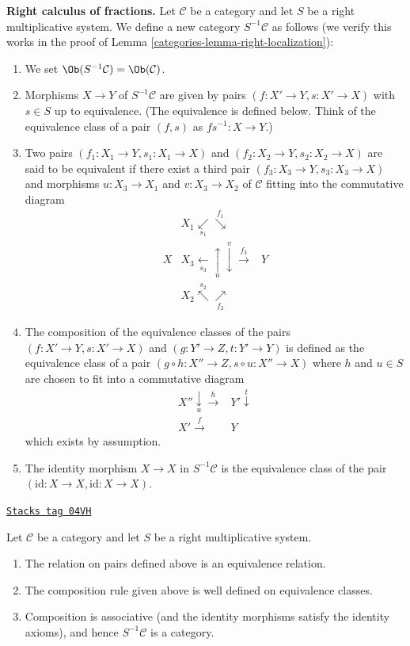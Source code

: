 {\bf Right calculus of fractions.}
Let $\mathcal{C}$ be a category and let $S$ be a right multiplicative
system. We define a new category $S^{-1}\mathcal{C}$ as follows
(we verify this works in the proof of
Lemma \ref{categories-lemma-right-localization}):
\begin{enumerate}
\item We set $\Ob(S^{-1}\mathcal{C}) = \Ob(\mathcal{C})$.
\item Morphisms $X \to Y$ of $S^{-1}\mathcal{C}$ are given by pairs
$(f : X' \to Y, s : X' \to X)$ with $s \in S$ up to equivalence.
(The equivalence is defined below. Think of the equivalence class
of a pair $(f, s)$ as $fs^{-1} : X \to Y$.)
\item Two pairs $(f_1 : X_1 \to Y, s_1 : X_1 \to X)$ and
$(f_2 : X_2 \to Y, s_2 : X_2 \to X)$ are said to be equivalent
if there exist a third pair $(f_3 : X_3 \to Y, s_3 : X_3 \to X)$
and morphisms $u : X_3 \to X_1$ and $v : X_3 \to X_2$ of $\mathcal{C}$
fitting into the commutative diagram
$$
\begin{array}{ccc} & X_1 \underset{s_1}{\swarrow}\overset{f_1}{\searrow} &  \\ X & X_3 \underset{s_3}{\longleftarrow}\underset{u}{\uparrow}\overset{v}{\downarrow}\overset{f_3}{\longrightarrow} & Y \\  & X_2 \overset{s_2}{\nwarrow}\underset{f_2}{\nearrow} & \end{array}
$$
\item The composition of the equivalence classes of the pairs
$(f : X' \to Y, s : X' \to X)$ and $(g : Y' \to Z, t : Y' \to Y)$
is defined as the equivalence class of a pair
$(g \circ h : X'' \to Z, s \circ u : X'' \to X)$
where $h$ and $u \in S$ are chosen to fit into a commutative diagram
$$
\begin{array}{cc}X'' \underset{u}{\downarrow}\overset{h}{\longrightarrow} & Y' \overset{t}{\downarrow} \\ X' \overset{f}{\longrightarrow} & Y\end{array}
$$
which exists by assumption.
\item The identity morphism $X \to X$ in $S^{-1} \mathcal{C}$ is the
equivalence class of the pair $(\text{id} : X \to X,
\text{id} : X \to X)$.
\end{enumerate}

\begin{lemma}
\label{categories-lemma-right-localization}
\href{https://stacks.math.columbia.edu/tag/04VH}{\texttt{Stacks tag 04VH}}

Let $\mathcal{C}$ be a category and let $S$ be a right multiplicative
system.
\begin{enumerate}
\item The relation on pairs defined above is an equivalence relation.
\item The composition rule given above is well defined on equivalence
classes.
\item Composition is associative (and the identity morphisms satisfy
the identity axioms), and hence $S^{-1}\mathcal{C}$ is a category.
\end{enumerate}
\end{lemma}

